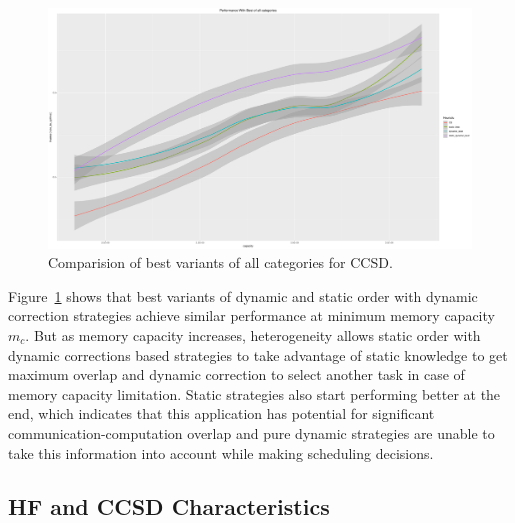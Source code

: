 \documentclass[sigconf]{acmart}
\begin{document}
{	
	\begin{figure}[htb]
		\includegraphics[scale=0.15]{./results/plots/inverse_ratio_to_optimal_ccsd-best.pdf}
		\caption{Comparision of best variants of all categories for CCSD.}
		\label{fig:ratio_to_optimal_best_ccsd}
	\end{figure}
	
	Figure~\ref{fig:ratio_to_optimal_best_ccsd} shows that best variants of dynamic and static order with dynamic correction  strategies achieve similar performance at minimum memory capacity $m_c$. But as memory capacity increases, heterogeneity allows static order with dynamic corrections based strategies to take advantage of static knowledge to get maximum overlap and dynamic correction to select another task in case of memory capacity limitation. Static strategies also start performing better at the end, which indicates that this application has potential for significant communication-computation overlap and pure dynamic strategies are unable to take this information into account while making scheduling decisions.
	
	\subsection{HF and CCSD Characteristics}
	
}
\end{document}

